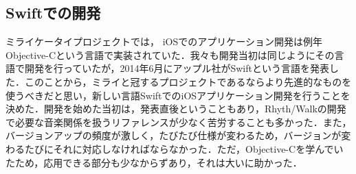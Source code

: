 \subsection{Swiftでの開発}
\par
ミライケータイプロジェクトでは， iOSでのアプリケーション開発は例年Objective-Cという言語で実装されていた．我々も開発当初は同じようにその言語で開発を行っていたが，2014年6月にアップル社がSwiftという言語を発表した．このことから，ミライと冠するプロジェクトであるならより先進的なものを使うべきだと思い，新しい言語SwiftでのiOSアプリケーション開発を行うことを決めた．開発を始めた当初は，発表直後ということもあり，Rhyth/Walkの開発で必要な音楽関係を扱うリファレンスが少なく苦労することも多かった．また，バージョンアップの頻度が激しく，たびたび仕様が変わるため，バージョンが変わるたびにそれに対応しなければならなかった．ただ，Objective-Cを学んでいたため，応用できる部分も少なからずあり，それは大いに助かった．
